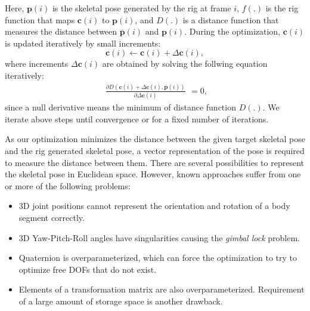 Here, $\mathbf{p}(i)$ is the skeletal pose generated by the rig at frame $i$, $f(.)$ is the rig function that maps $\mathbf{c}(i)$ to $\mathbf{p}(i)$, and $D(.)$ is a distance function that measures the distance between $\bar{\mathbf{p}}(i)$ and $\mathbf{p}(i)$.
During the optimization, $\mathbf{c}(i)$ is updated iteratively by small increments:
\begin{equation}
	\mathbf{c}(i)\leftarrow \mathbf{c}(i)+\Delta{}\mathbf{c}(i),
\end{equation}
where increments $\Delta\mathbf{c}(i)$ are obtained by solving the follwing equation iteratively:
\begin{equation}
	\begin{matrix}
	\frac{\partial D\left(\mathbf{c}(i)+\Delta{}\mathbf{c}(i),\bar{\mathbf{p}}(i)\right) }{\partial\Delta{}\mathbf{c}(i) }
	\end{matrix} = 0,
\end{equation}
since a null derivative means the minimum of distance function $D(.)$.
We iterate above steps until convergence or for a fixed number of iterations. 

As our optimization minimizes the distance between the given target skeletal pose and the rig generated skeletal pose, a vector representation of the pose is required to measure the distance between them. There are several possibilities to represent the skeletal pose in Euclidean space. However, known approaches suffer from one or more of the following problems\cite{blanco2010tutorial}:
\begin{itemize}
  \item 3D joint positions cannot represent the orientation and rotation of a body segment correctly.
  \item 3D Yaw-Pitch-Roll angles have singularities causing the \textit{gimbal lock} problem.
  \item Quaternion is overparameterized, which can force the optimization to try to optimize free DOFs that do not exist.
  \item Elements of a transformation matrix are also overparameterized. Requirement of a large amount of storage space is another drawback.
\end{itemize}

